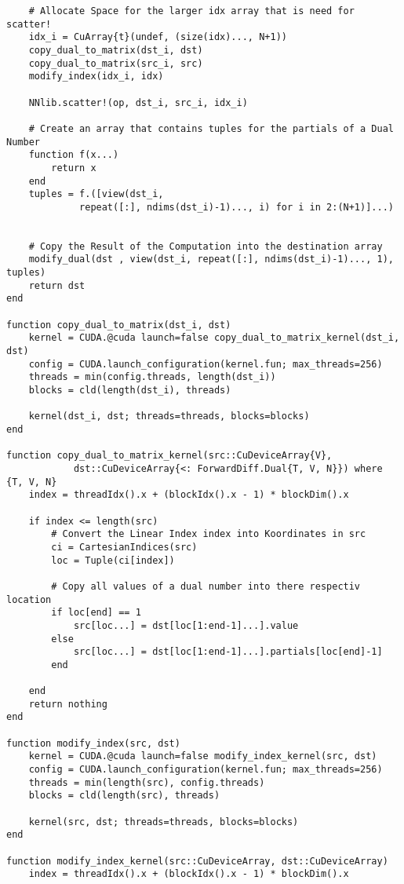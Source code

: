\begin{lstlisting}
    # Allocate Space for the larger idx array that is need for scatter!
    idx_i = CuArray{t}(undef, (size(idx)..., N+1))
    copy_dual_to_matrix(dst_i, dst)
    copy_dual_to_matrix(src_i, src)
    modify_index(idx_i, idx)

    NNlib.scatter!(op, dst_i, src_i, idx_i) 
    
    # Create an array that contains tuples for the partials of a Dual Number
    function f(x...)
        return x
    end
    tuples = f.([view(dst_i, 
             repeat([:], ndims(dst_i)-1)..., i) for i in 2:(N+1)]...)


    # Copy the Result of the Computation into the destination array
    modify_dual(dst , view(dst_i, repeat([:], ndims(dst_i)-1)..., 1), tuples)
    return dst
end

function copy_dual_to_matrix(dst_i, dst)
    kernel = CUDA.@cuda launch=false copy_dual_to_matrix_kernel(dst_i, dst)
    config = CUDA.launch_configuration(kernel.fun; max_threads=256)
    threads = min(config.threads, length(dst_i))
    blocks = cld(length(dst_i), threads)
    
    kernel(dst_i, dst; threads=threads, blocks=blocks)
end

function copy_dual_to_matrix_kernel(src::CuDeviceArray{V}, 
            dst::CuDeviceArray{<: ForwardDiff.Dual{T, V, N}}) where {T, V, N}
    index = threadIdx().x + (blockIdx().x - 1) * blockDim().x
   
    if index <= length(src) 
        # Convert the Linear Index index into Koordinates in src
        ci = CartesianIndices(src)
        loc = Tuple(ci[index])
        
        # Copy all values of a dual number into there respectiv location
        if loc[end] == 1
            src[loc...] = dst[loc[1:end-1]...].value 
        else 
            src[loc...] = dst[loc[1:end-1]...].partials[loc[end]-1]
        end

    end
    return nothing
end

function modify_index(src, dst)
    kernel = CUDA.@cuda launch=false modify_index_kernel(src, dst) 
    config = CUDA.launch_configuration(kernel.fun; max_threads=256)
    threads = min(length(src), config.threads)
    blocks = cld(length(src), threads)
    
    kernel(src, dst; threads=threads, blocks=blocks)
end

function modify_index_kernel(src::CuDeviceArray, dst::CuDeviceArray)
    index = threadIdx().x + (blockIdx().x - 1) * blockDim().x
    

\end{lstlisting}
